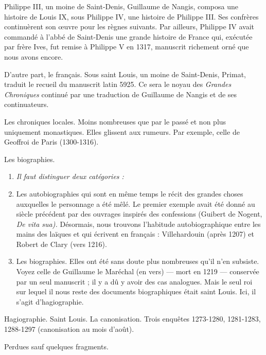 \documentclass[french,twoside]{book} %
\newlength{\listmod}
\newcommand{\listhead}[1]{\hspace{-1\listmod}\emph{#1}}
\newcommand{\labelchar}[1]{{\color{rubric}\bf #1}}
\begin{document}
\label{p4} Philippe III, un moine de Saint-Denis, Guillaume de Nangis, composa une histoire de Louis IX, sous Philippe IV, une histoire de Philippe III. Ses confrères continuèrent son œuvre pour les règnes suivants. Par ailleurs, Philippe IV avait commandé à l’abbé de Saint-Denis une grande histoire de France qui, exécutée par frère Ives, fut remise à Philippe V en 1317, manuscrit richement orné que nous avons encore.\par
D’autre part, le français. Sous saint Louis, un moine de Saint-Denis, Primat, traduit le recueil du manuscrit latin 5925. Ce sera le noyau des \emph{Grandes Chroniques} continué par une traduction de Guillaume de Nangis et de ses continuateurs.\par
\bigbreak
\noindent \labelchar{d)} Les chroniques locales. Moins nombreuses que par le passé et non plus uniquement monastiques. Elles glissent aux rumeurs. Par exemple, celle de Geoffroi de Paris (1300-1316).\par
\bigbreak
\noindent \labelchar{e)} Les biographies.\par

\begin{enumerate}[itemsep=0pt,]
\item[]\listhead{Il faut distinguer deux catégories :}
\item Les autobiographies qui sont en même temps le récit des grandes choses auxquelles le personnage a été mêlé. Le premier exemple avait été donné au siècle précédent par des ouvrages inspirés des confessions (Guibert de Nogent, {\itshape De vita sua).} Désormais, nous trouvons l’habitude autobiographique entre les mains des laïques et qui écrivent en français : Villehardouin (après 1207) et Robert de Clary (vers 1216).
\item Les biographies. Elles ont été sans doute plus nombreuses qu’il n’en subsiste. Voyez celle de Guillaume le Maréchal (en vers) — mort en 1219 — conservée par un seul manuscrit ; il y a dû y avoir des cas analogues. Mais le seul roi sur lequel il nous reste des documents biographiques était saint Louis. Ici, il s’agit d’hagiographie.

\end{enumerate}\bigbreak
\noindent \labelchar{f)} Hagiographie. Saint Louis. La canonisation. Trois enquêtes 1273-1280, 1281-1283, 1288-1297 (canonisation au mois d’août).\par
Perdues sauf quelques fragments.\par
\end{document}
